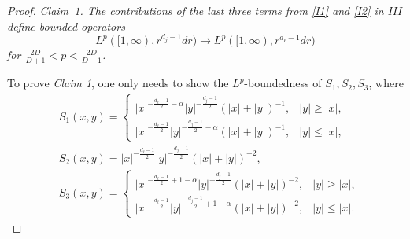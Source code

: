 \documentclass[10pt,a4paper]{amsart}
\begin{document}
\begin{proof}
\textit{Claim~1. The contributions of the last three terms from \eqref{I1} and \eqref{I2} in $III$ define bounded operators
$$L^p([1,\infty),r^{d_j-1}dr) \to L^p([1,\infty),r^{d_\ell-1}dr) $$
for $\frac{2D}{D+1}<p<\frac{2D}{D-1}$.}

To prove \textit{Claim 1}, one only needs to show the $L^p$-boundedness of $S_1, S_2, S_3$, where
\begin{align*}
    &S_1(x,y) = \begin{cases}
        |x|^{-\frac{d_\ell-1}{2}-\alpha}|y|^{-\frac{d_j-1}{2}}(|x|+|y|)^{-1}, & |y|\ge |x|,\\
        |x|^{-\frac{d_\ell-1}{2}} |y|^{-\frac{d_j-1}{2}-\alpha} (|x|+|y|)^{-1}, & |y|\le |x|,
    \end{cases}  \\
    &S_2(x,y) = |x|^{-\frac{d_\ell-1}{2}}|y|^{-\frac{d_j-1}{2}} (|x|+|y|)^{-2},\\
    &S_3(x,y) = \begin{cases}
        |x|^{-\frac{d_\ell-1}{2}+1-\alpha}  |y|^{-\frac{d_j-1}{2} }(|x|+|y|)^{-2}, & |y|\ge |x|,\\
         |x|^{-\frac{d_\ell-1}{2}} |y|^{-\frac{d_j-1}{2} +1-\alpha }(|x|+|y|)^{-2}, & |y|\le |x|.
    \end{cases}
\end{align*}


\end{proof}
\end{document}
